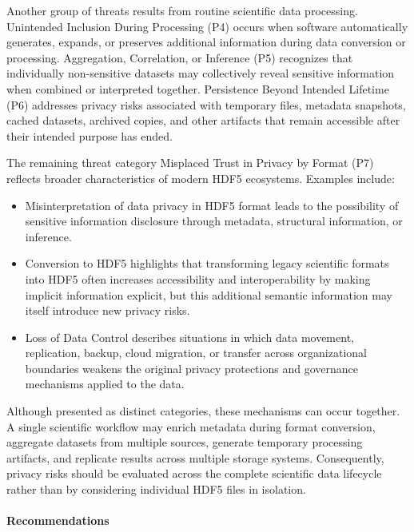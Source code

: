 \documentclass[../main.tex]{subfiles}
\begin{document}
Another group of threats results from routine scientific data processing. Unintended
Inclusion During Processing (P4) occurs when software automatically generates, expands,
or preserves additional information during data conversion or processing.
Aggregation, Correlation, or Inference (P5) recognizes that individually non-sensitive
datasets may collectively reveal sensitive information when combined or interpreted 
together. Persistence Beyond Intended Lifetime (P6) addresses privacy risks
associated with temporary files, metadata snapshots, cached datasets, 
archived copies, and other artifacts that remain accessible after their 
intended purpose has ended.

The remaining threat category Misplaced Trust in Privacy by Format (P7) reflects broader
characteristics of modern HDF5 ecosystems. Examples include: 

\begin{itemize}

\item Misinterpretation of data privacy in HDF5 format leads to the possibility of 
sensitive information disclosure through metadata, structural information, or inference.

\item Conversion to HDF5 highlights that transforming legacy scientific formats 
into HDF5 often increases accessibility and interoperability by making implicit 
information explicit, but this additional semantic information may itself introduce new privacy risks. 

\item Loss of Data Control describes situations in which data movement, replication, 
backup, cloud migration, or transfer across organizational boundaries weakens the 
original privacy protections and governance mechanisms applied to the data.

\end{itemize}

Although presented as distinct categories, these mechanisms can occur together.
A single scientific workflow may enrich metadata during format conversion, aggregate 
datasets from multiple sources, generate temporary processing artifacts, and 
replicate results across multiple storage systems. Consequently, privacy risks should 
be evaluated across the complete scientific data lifecycle rather than 
by considering individual HDF5 files in isolation.

\paragraph{Recommendations}\mbox{}\\
\end{document}
